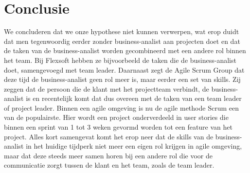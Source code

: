 \documentclass{hogent-article}
\begin{document}
\section{Conclusie}
We concluderen dat we onze hypothese niet kunnen verwerpen, wat erop duidt dat men tegenwoordig eerder zonder business-analist aan projecten doet en dat de taken van de business-analist worden gecombineerd met een andere rol binnen het team.
Bij Flexsoft hebben ze bijvoorbeeld de taken die de business-analist doet, samengevoegd met team leader. \newline \newline
Daarnaast zegt de Agile Scrum Group dat deze tijd de business-analist geen rol meer is, maar eerder een set van skills. Zij zeggen dat de persoon die de klant met het projectteam verbindt, de business-analist is en recentelijk komt dat dus overeen met de taken van een team leader of project leader. \newline \newline
Binnen een agile omgeving is nu de agile methode Scrum een van de populairste. Hier wordt een project onderverdeeld in user stories die binnen een sprint van 1 tot 3 weken gevormd worden tot een feature van het project. \newline \newline
Alles kort samengevat komt het erop neer dat de skills van de business-analist in het huidige tijdperk niet meer een eigen rol krijgen in agile omgeving, maar dat deze steeds meer samen horen bij een andere rol die voor de communicatie zorgt tussen de klant en het team, zoals de team leader.



\printbibliography
\end{document}
